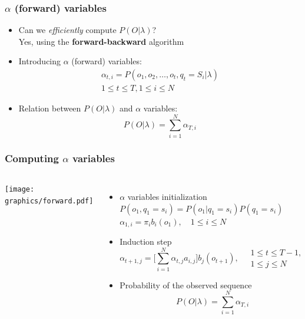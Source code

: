 \documentclass{beamer}
\begin{document}
\begin{frame}
  \frametitle{$\alpha$ (forward) variables}
  \begin{itemize}
  \item Can we \emph{efficiently} compute $P(O \vert \lambda)$?\\
    \vspace*{.5em} Yes, using the \textbf{forward-backward} algorithm
    \vspace*{1em} \pause
  \item Introducing $\alpha$ (forward) variables:
    \begin{equation}
      \label{eq:alpha}
      \begin{split}
        \alpha_{t,i}=P(o_1,o_2,\ldots,o_t, q_t = S_i \vert \lambda) \\
        \scriptstyle{1 \le t \le T, 1 \le i \le N}
      \end{split}
    \end{equation}
    \pause
  \item Relation between $P(O \vert \lambda)$ and $\alpha$ variables:
    \begin{equation}
      \label{eq:eq1toalpha}
      P(O \vert \lambda) = \displaystyle\sum_{i=1}^{N}\alpha_{T,i}
    \end{equation}
  \end{itemize}
\end{frame}


\begin{frame}
  \frametitle{Computing $\alpha$ variables}
  \begin{columns}
    \texttt{[image: graphics/forward.pdf]}
    \begin{itemize}
    \item $\alpha$ variables initialization \\
      $P(o_1,q_1=s_i) = P(o_1 \vert q_1=s_i)P(q_1=s_i)$ \\
      $\alpha_{1,i}=\pi_ib_i(o_1), \quad 1 \le i \le N$ \pause
    \item Induction step
      \begin{equation*}
        \label{eq:alpha_induct}
        \alpha_{t+1,j}=\Big[ \displaystyle\sum_{i=1}^{N}\alpha_{t,j}a_{i,j}\Big] b_{j}(o_{t+1}), \quad \substack{1 \le t \le T-1, \\ 1 \le j \le N}
      \end{equation*}
    \item Probability of the observed sequence
      \begin{equation*}
        \label{eq:alpha_term}
        P(O \vert \lambda) = \displaystyle\sum_{i=1}^{N}\alpha_{T,i}
      \end{equation*}
    \end{itemize}
  \end{columns}
\end{frame}
\end{document}
